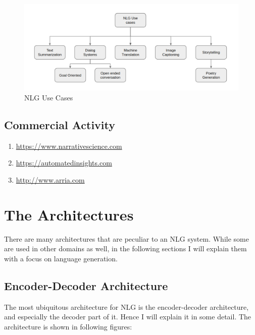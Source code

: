 \documentclass[]{krantz}
\providecommand{\tightlist}{%
  \setlength{\itemsep}{0pt}\setlength{\parskip}{0pt}}
\begin{document}
\begin{figure}
\centering
\includegraphics{figures/nlg_use_cases.png}
\caption{NLG Use Cases}
\end{figure}

\hypertarget{commercial-activity}{%
\section{Commercial Activity}\label{commercial-activity}}

\begin{enumerate}
\def\labelenumi{\arabic{enumi}.}
\tightlist
\item
  \url{https://www.narrativescience.com}
\item
  \url{https://automatedinsights.com}
\item
  \url{http://www.arria.com}
\end{enumerate}

\hypertarget{the-architectures}{%
\chapter{The Architectures}\label{the-architectures}}

There are many architectures that are peculiar to an NLG system. While some are used in other domains as well, in the following sections I will explain them with a focus on language generation.

\hypertarget{encoder-decoder-architecture-1}{%
\section{Encoder-Decoder Architecture}\label{encoder-decoder-architecture-1}}

The most ubiquitous architecture for NLG is the encoder-decoder architecture, and especially the decoder part of it. Hence I will explain it in some detail. The architecture is shown in following figures:
\end{document}
